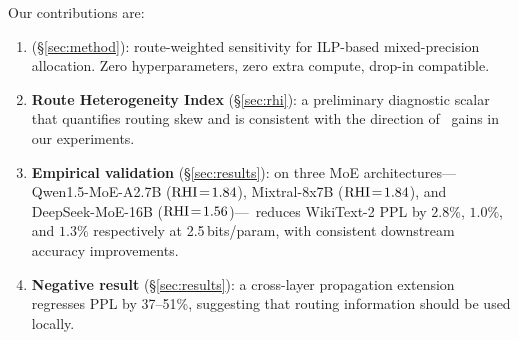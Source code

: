 Our contributions are:
\begin{enumerate}
\item \textbf{\method} (\S\ref{sec:method}): route-weighted sensitivity for ILP-based mixed-precision allocation. Zero hyperparameters, zero extra compute, drop-in compatible.
\item \textbf{Route Heterogeneity Index} (\S\ref{sec:rhi}): a preliminary diagnostic scalar that quantifies routing skew and is consistent with the direction of \method\ gains in our experiments.
\item \textbf{Empirical validation} (\S\ref{sec:results}): on three MoE architectures---Qwen1.5-MoE-A2.7B ($\mathrm{RHI}\!=\!1.84$), Mixtral-8x7B ($\mathrm{RHI}\!=\!1.84$), and DeepSeek-MoE-16B ($\mathrm{RHI}\!=\!1.56$)---\method\ reduces WikiText-2 PPL by $2.8\%$, $1.0\%$, and $1.3\%$ respectively at 2.5\,bits/param, with consistent downstream accuracy improvements.
\item \textbf{Negative result} (\S\ref{sec:results}): a cross-layer propagation extension regresses PPL by 37--51\%, suggesting that routing information should be used locally.
\end{enumerate}
